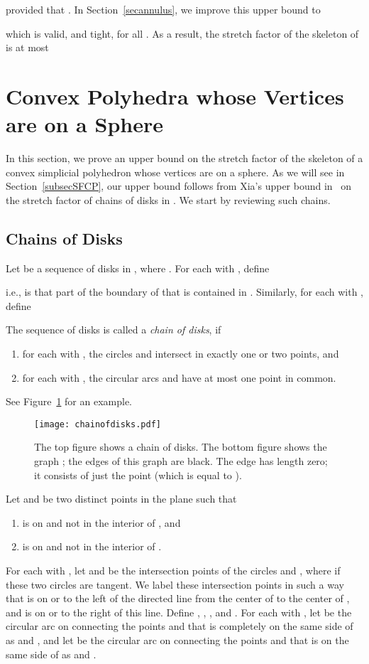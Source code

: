\documentclass[12pt]{article}
\begin{document}
provided that . In Section~\ref{secannulus}, we improve 
this upper bound to 

which is valid, and tight, for all . As a result, the stretch 
factor of the skeleton of  is at most 
 


\section{Convex Polyhedra whose Vertices are on a Sphere}  
\label{seconsphere} 
In this section, we prove an upper bound on the stretch factor of the 
skeleton of a convex simplicial polyhedron whose vertices are on a 
sphere. As we will see in Section~\ref{subsecSFCP}, our 
upper bound follows from Xia's upper bound in~\cite{x-sfdtl-13} on the 
stretch factor of chains of disks in . We start by reviewing 
such chains. 

\subsection{Chains of Disks} \label{secCoD}
Let  be a sequence of disks in 
, where . For each  with , define

i.e.,  is that part of the boundary of  that is contained 
in . Similarly, for each  with , define 
 
The sequence  of disks is called a \emph{chain of disks}, 
if  
\begin{enumerate} 
\item for each  with , the circles  and 
       intersect in exactly one or two points, and  
\item for each  with , the circular arcs  
      and  have at most one point in common. 
\end{enumerate} 
See Figure~\ref{figCoD} for an example. 

\begin{figure}
\begin{center}
\texttt{[image: chainofdisks.pdf]}
\end{center}
\caption{The top figure shows a chain 
     of disks. The bottom figure 
    shows the graph ; the edges of this graph are 
    black. The edge  has length zero; it consists of just the 
    point  (which is equal to ).}
\label{figCoD}
\end{figure}

Let  and  be two distinct points in the plane such that
\begin{enumerate} 
\item  is on  and not in the interior of , and  
\item  is on  and not in the interior of .  
\end{enumerate} 
For each  with , let  and  be the intersection 
points of the circles  and , where 
 if these two circles are tangent. We label these intersection 
points in such a way that  is on or to the left of the directed 
line from the center of  to the center of , and  is on 
or to the right of this line. Define , , , and 
. For each  with , let  be the circular 
arc on  connecting the points  and  that 
is completely on the same side of  as  and , and 
let  be the circular arc on  connecting the points 
 and  that is on the same side of  as  and 
. 
\end{document}
